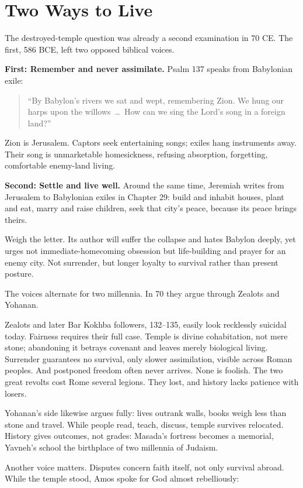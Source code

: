 \section{Two Ways to Live}
The destroyed-temple question was already a second examination in 70 CE. The first, 586 BCE, left two opposed biblical voices.

\textbf{First: Remember and never assimilate.} Psalm 137 speaks from Babylonian exile:

\begin{quote}
``By Babylon's rivers we sat and wept, remembering Zion. We hung our harps upon the willows \,\ldots\, How can we sing the Lord's song in a foreign land?''
\end{quote}
Zion is Jerusalem. Captors seek entertaining songs; exiles hang instruments away. Their song is unmarketable homesickness, refusing absorption, forgetting, comfortable enemy-land living.

\textbf{Second: Settle and live well.} Around the same time, Jeremiah writes from Jerusalem to Babylonian exiles in Chapter 29: build and inhabit houses, plant and eat, marry and raise children, seek that city's peace, because its peace brings theirs.

Weigh the letter. Its author will suffer the collapse and hates Babylon deeply, yet urges not immediate-homecoming obsession but life-building and prayer for an enemy city. Not surrender, but longer loyalty to survival rather than present posture.

The voices alternate for two millennia. In 70 they argue through Zealots and Yohanan.

Zealots and later Bar Kokhba followers, 132--135, easily look recklessly suicidal today. Fairness requires their full case. Temple is divine cohabitation, not mere stone; abandoning it betrays covenant and leaves merely biological living. Surrender guarantees no survival, only slower assimilation, visible across Roman peoples. And postponed freedom often never arrives. None is foolish. The two great revolts cost Rome several legions. They lost, and history lacks patience with losers.

Yohanan's side likewise argues fully: lives outrank walls, books weigh less than stone and travel. While people read, teach, discuss, temple survives relocated. History gives outcomes, not grades: Masada's fortress becomes a memorial, Yavneh's school the birthplace of two millennia of Judaism.

Another voice matters. Disputes concern faith itself, not only survival abroad. While the temple stood, Amos spoke for God almost rebelliously:

